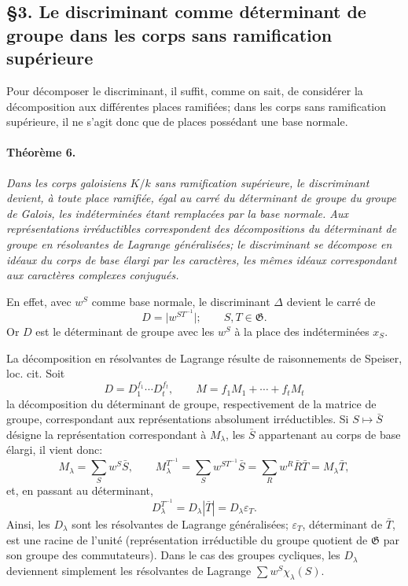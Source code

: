 \subsection*{\S3. Le discriminant comme déterminant de groupe dans les corps sans ramification supérieure}

Pour décomposer le discriminant, il suffit, comme on sait, de considérer la décomposition aux différentes places ramifiées; dans les corps sans ramification supérieure, il ne s'agit donc que de places possédant une base normale.

\paragraph{Théorème 6.}
\emph{Dans les corps galoisiens \(K/k\) sans ramification supérieure, le discriminant devient, à toute place ramifiée, égal au carré du déterminant de groupe du groupe de Galois, les indéterminées étant remplacées par la base normale. Aux représentations irréductibles correspondent des décompositions du déterminant de groupe en résolvantes de Lagrange généralisées; le discriminant se décompose en idéaux du corps de base élargi par les caractères, les mêmes idéaux correspondant aux caractères complexes conjugués.}

En effet, avec \(w^S\) comme base normale, le discriminant \(\Delta\) devient le carré de
\[
        D=\bigl|w^{ST^{-1}}\bigr|;\qquad S,T\in\mathfrak{G}.
\]
Or \(D\) est le déterminant de groupe avec les \(w^S\) à la place des indéterminées \(x_S\).

La décomposition en résolvantes de Lagrange résulte de raisonnements de Speiser, loc. cit. Soit
\[
        D=D_1^{f_1}\cdots D_t^{f_t},
        \qquad
        M=f_1M_1+\cdots+f_tM_t
\]
la décomposition du déterminant de groupe, respectivement de la matrice de groupe, correspondant aux représentations absolument irréductibles. Si \(S\mapsto\bar S\) désigne la représentation correspondant à \(M_\lambda\), les \(\bar S\) appartenant au corps de base élargi, il vient donc:
\[
        M_\lambda=\sum_S w^S\bar S,
        \qquad
        M_\lambda^{T^{-1}}=\sum_S w^{ST^{-1}}\bar S
          =\sum_R w^R\bar R\bar T=M_\lambda\bar T,
\]
et, en passant au déterminant,
\[
        D_\lambda^{T^{-1}}=D_\lambda|\bar T|=D_\lambda\varepsilon_T.
\]
Ainsi, les \(D_\lambda\) sont les résolvantes de Lagrange généralisées; \(\varepsilon_T\), déterminant de \(\bar T\), est une racine de l'unité (représentation irréductible du groupe quotient de \(\mathfrak{G}\) par son groupe des commutateurs). Dans le cas des groupes cycliques, les \(D_\lambda\) deviennent simplement les résolvantes de Lagrange \(\sum w^S\chi_\lambda(S)\).

